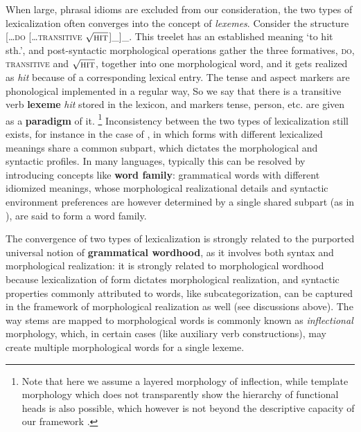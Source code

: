 \documentclass[UTF8, a4paper, oneside, scheme=plain, 12pt]{ctexrep}
\newcommand*{\concept}[1]{\textbf{#1}}
\newcommand{\form}[1]{\emph{#1}}
\newcommand{\translate}[1]{`#1'}
\newcommand*{\category}[1]{\textsc{#1}}
\newcommand*{\wordroot}[1]{$\sqrt{\text{\textsc{#1}}}$}
\begin{document}
{When large, phrasal idioms are excluded from our consideration,
the two types of lexicalization often converges into the concept of \emph{lexemes}.
Consider the structure [\dots \category{do} [\dots \category{transitive} \wordroot{hit}]_{}]_{}.
This treelet has an established meaning \translate{to hit sth.},
and post-syntactic morphological operations gather the three formatives,
\category{do}, \category{transitive} and \wordroot{hit}, together into one morphological word,
and it gets realized as \form{hit} because of a corresponding lexical entry.
The tense and aspect markers are phonological implemented in a regular way,
So we say that there is a transitive verb \concept{lexeme} \form{hit} stored in the lexicon,
and markers tense, person, etc. are given as a \concept{paradigm} of it.%
\footnote{
    Note that here we assume a layered morphology of inflection,
    while template morphology which does not transparently show the hierarchy of functional heads
    is also possible, which however is not beyond the descriptive capacity of our framework
    \citep{bye2020morpheme}.
}
Inconsistency between the two types of lexicalization still exists,
for instance in the case of ,
in which forms with different lexicalized meanings 
share a common subpart, which dictates the morphological and syntactic profiles.
In many languages, typically this can be resolved by introducing concepts like \concept{word family}:
grammatical words with different idiomized meanings,
whose morphological realizational details and syntactic environment preferences are however determined by a single shared subpart (as in ),
are said to form a word family.

The convergence of two types of lexicalization
is strongly related to the purported universal notion of \concept{grammatical wordhood},
as it involves both syntax and morphological realization:
it is strongly related to morphological wordhood
because lexicalization of form dictates morphological realization,
and syntactic properties commonly attributed to words, like subcategorization,
can be captured in the framework of morphological realization as well 
(see discussions above).
The way stems are mapped to morphological words is commonly known as \emph{inflectional} morphology,
which, in certain cases (like auxiliary verb constructions),
may create multiple morphological words for a single lexeme.

}
\end{document}
